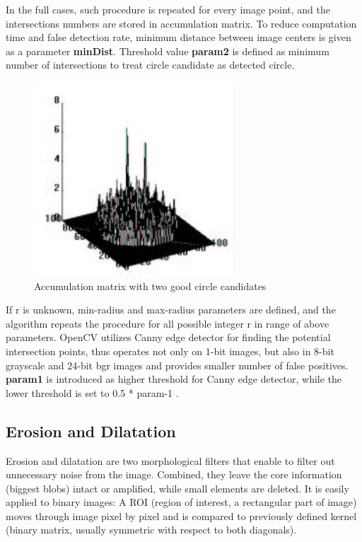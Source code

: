 \documentclass[12pt,twoside,a4paper]{article}
\begin{document}
In the full cases, such procedure is repeated for every image point, and the intersections numbers are stored in accumulation matrix.\cite{hgt}
To reduce computation time and false detection rate, minimum distance between image centers is given as a parameter \textbf{minDist}.
Threshold value \textbf{param2} is defined as minimum number of intersections to treat circle candidate as detected circle.
 
\begin{figure}[H]
\centering
\includegraphics[width=0.4\paperwidth]{accu}
\caption{Accumulation matrix with two good circle candidates\cite{hgt}}
\end{figure}

If r is unknown, min-radius and max-radius parameters are defined, and the algorithm repeats the procedure for all possible integer r in range of above parameters.
OpenCV utilizes Canny edge detector for finding the potential intersection points, thus operates not only on 1-bit images, but also in 8-bit grayscale and 24-bit bgr images and provides smaller number of false positives.\cite{mastercv}
\textbf{param1} is introduced as higher threshold for Canny edge detector, while the lower threshold is set to 0.5 * param-1\cite{fd} .


\subsection{Erosion and Dilatation}
Erosion and dilatation are two morphological filters that enable to filter out unnecessary noise from the image.
Combined, they leave the core information (biggest blobs) intact or amplified, while small elements are deleted.
It is easily applied to binary images:
A ROI (region of interest, a rectangular part of image) moves through image pixel by pixel and is compared to previously defined kernel (binary matrix, usually symmetric with respect to both diagonals).
\end{document}
